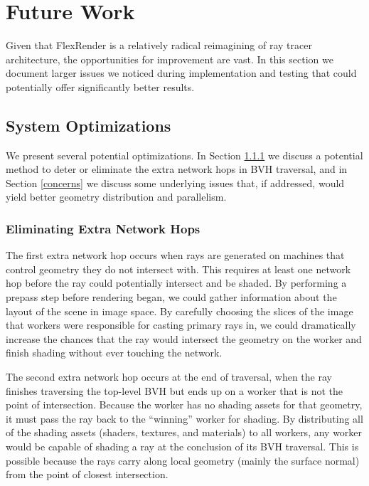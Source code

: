 \documentclass[12pt]{ucthesis}
\begin{document}
\chapter{Future Work}
\label{futurework}

Given that FlexRender is a relatively radical reimagining of ray tracer
architecture, the opportunities for improvement are vast. In this section we
document larger issues we noticed during implementation and testing that
could potentially offer significantly better results.

\section{System Optimizations}
\label{optimizations}

We present several potential optimizations. In Section \ref{networkhop} we
discuss a potential method to deter or eliminate the extra network hops in BVH
traversal, and in Section \ref{concerns} we discuss some underlying issues that,
if addressed, would yield better geometry distribution and parallelism.

\subsection{Eliminating Extra Network Hops}
\label{networkhop}

The first extra network hop occurs when rays are generated on machines that
control geometry they do not intersect with. This requires at least one
network hop before the ray could potentially intersect and be shaded. By performing
a prepass step before rendering began, we could gather information about the
layout of the scene in image space. By carefully choosing the slices of the
image that workers were responsible for casting primary rays in, we could
dramatically increase the chances that the ray would intersect the geometry
on the worker and finish shading without ever touching the network.

The second extra network hop occurs at the end of traversal, when the ray finishes
traversing the top-level BVH but ends up on a worker that is not the point of
intersection. Because the worker has no shading assets for that geometry, it
must pass the ray back to the ``winning'' worker for shading. By distributing
all of the shading assets (shaders, textures, and materials) to all workers,
any worker would be capable of shading a ray at the conclusion of its BVH traversal.
This is possible because the rays carry along local geometry (mainly the surface
normal) from the point of closest intersection.
\end{document}
